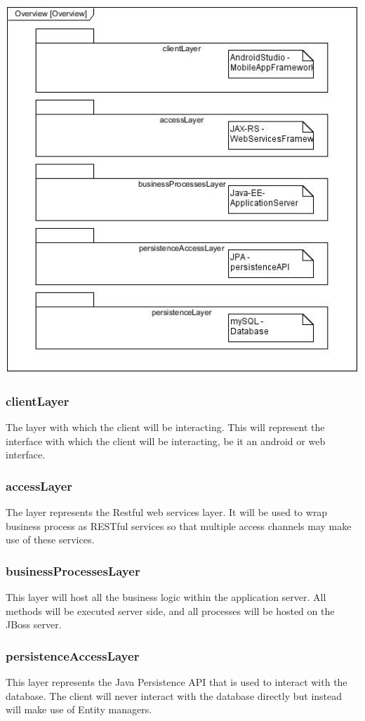 \documentclass[a4paper,12pt]{article}
\begin{document}
	\includegraphics[width=1\textwidth]{./Pictures/UML/architectureOverview.jpg}\\[1.5cm]
	
	
	\subsubsection{clientLayer}
	The layer with which the client will be interacting. This will represent the interface with which the client will be interacting, be it an android or web interface.
	\subsubsection{accessLayer}
	The layer represents the Restful web services layer. It will be used to wrap business process as RESTful services so that multiple access channels may make use of these services. 
	\subsubsection{businessProcessesLayer}
	This layer will host all the business logic within the application server. All methods will be executed server side, and all processes will be hosted on the JBoss server.
	\subsubsection{persistenceAccessLayer}
	This layer represents the Java Persistence API that is used to interact with the database. The client will never interact with the database directly but instead will make use of Entity managers.
\end{document}
